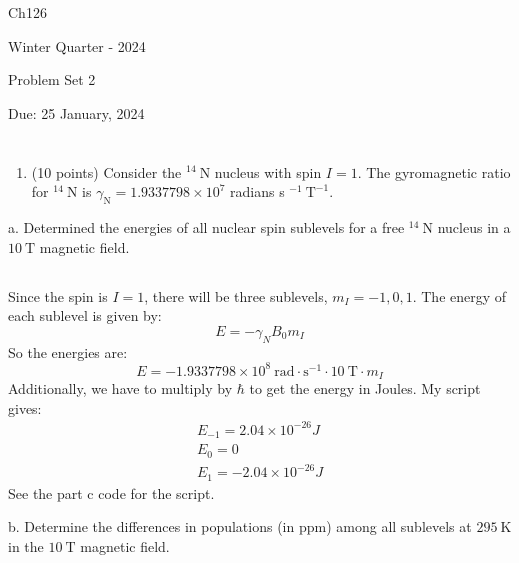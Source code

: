 \documentclass[12pt]{article}
\begin{document}
Ch126

Winter Quarter - 2024

Problem Set 2

Due: 25 January, 2024
\section{}
\begin{enumerate}
  \item (10 points) Consider the ${ }^{14} \mathrm{~N}$ nucleus with spin $I=1$. The gyromagnetic ratio for ${ }^{14} \mathrm{~N}$ is $\gamma_{\mathrm{N}}=1.9337798 \times 10^{7}$ radians s $^{-1} \mathrm{~T}^{-1}$.
\end{enumerate}

a. Determined the energies of all nuclear spin sublevels for a free ${ }^{14} \mathrm{~N}$ nucleus in a $10 \mathrm{~T}$ magnetic field.
\subsection{}
Since the spin is $I=1$, there will be three sublevels, $m_I = -1, 0, 1$. The energy of each sublevel is given by:
\begin{equation}
  E = -\gamma_N B_0 m_I
\end{equation}
So the energies are:
\begin{equation}
  E = -1.9337798 \times 10^{8} \mathrm{~rad} \cdot \mathrm{s}^{-1} \cdot 10 \mathrm{~T} \cdot m_I
\end{equation}
Additionally, we have to multiply by $\hbar$ to get the energy in Joules.
My script gives:
\begin{align}
  E_{-1} = 2.04 \times 10^{-26} J\\
  E_{0} = 0\\
  E_{1} = -2.04 \times 10^{-26} J
\end{align}
See the part c code for the script.


b. Determine the differences in populations (in ppm) among all sublevels at $295 \mathrm{~K}$ in the $10 \mathrm{~T}$ magnetic field.
\end{document}
